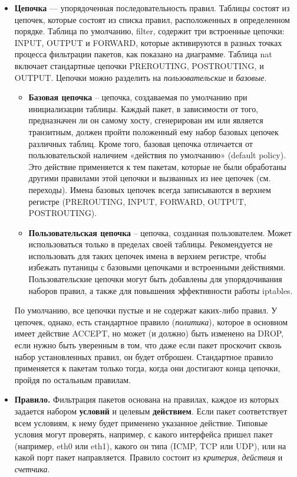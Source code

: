 \documentclass[a4paper]{article}
\begin{document}
\begin{itemize}
		\item \textbf{Цепочка} — упорядоченная последовательность правил. Таблицы состоят из цепочек, которые состоят из списка правил, расположенных в определенном порядке. Таблица по умолчанию, filter, содержит три встроенные цепочки: INPUT, OUTPUT и FORWARD, которые активируются в разных точках процесса фильтрации пакетов, как показано на диаграмме. Таблица nat включает стандартные цепочки PREROUTING, POSTROUTING, и OUTPUT. Цепочки можно разделить на \emph{пользовательские} и \emph{базовые}.
			\begin{itemize}
				\item 
				\textbf{Базовая цепочка} -- цепочка, создаваемая по умолчанию при инициализации таблицы. Каждый пакет, в зависимости от того, предназначен ли он самому хосту, сгенерирован им или является транзитным, должен пройти положенный ему набор базовых цепочек различных таблиц. Кроме того, базовая цепочка отличается от пользовательской наличием «действия по умолчанию» (default policy). Это действие применяется к тем пакетам, которые не были обработаны другими правилами этой цепочки и вызванных из нее цепочек (см. переходы). Имена базовых цепочек всегда записываются в верхнем регистре (PREROUTING, INPUT, FORWARD, OUTPUT, POSTROUTING).
				\item 
				\textbf{Пользовательская цепочка} -- цепочка, созданная пользователем. Может использоваться только в пределах своей таблицы. Рекомендуется не использовать для таких цепочек имена в верхнем регистре, чтобы избежать путаницы с базовыми цепочками и встроенными действиями. Пользовательские цепочки могут быть добавлены для упорядочивания наборов правил, а также для повышения эффективности работы iptables.
			\end{itemize}
			По умолчанию, все цепочки пустые и не содержат каких-либо правил. У цепочек, однако, есть стандартное правило (\emph{политика}), которое в основном имеет действие ACCEPT, но может (и должно) быть изменено на DROP, если нужно быть уверенным в том, что даже если пакет проскочит сквозь набор установленных правил, он будет отброшен. Стандартное правило применяется к пакетам только тогда, когда они достигают конца цепочки, пройдя по остальным правилам.
		\item 
		\textbf{Правило.} Фильтрация пакетов основана на правилах, каждое из которых задается набором \textbf{условий} и целевым \textbf{действием}. Если пакет соответствует всем условиям, к нему будет применено указанное действие. Типовые условия могут проверять, например, с какого интерфейса пришел пакет (например, eth0 или eth1), какого он типа (ICMP, TCP или UDP), или на какой порт пакет направляется. Правило состоит из \emph{критерия}, \emph{действия} и \emph{счетчика}.

\end{itemize}
\end{document}
